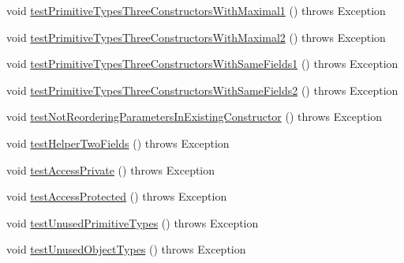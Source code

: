 \begin{DoxyCompactItemize}
\item 
void \hyperlink{classedu_1_1illinois_1_1canistelCassabanana_1_1tests_1_1RemoveDuplicateCodeInConstructorsRefactoringTests_a0e9308bcca1cb335ba5a7f7c263d2ac5}{testPrimitiveTypesThreeConstructorsWithMaximal1} ()  throws Exception 
\item 
void \hyperlink{classedu_1_1illinois_1_1canistelCassabanana_1_1tests_1_1RemoveDuplicateCodeInConstructorsRefactoringTests_a885c02b65cfeeb832428fdce080882e9}{testPrimitiveTypesThreeConstructorsWithMaximal2} ()  throws Exception 
\item 
void \hyperlink{classedu_1_1illinois_1_1canistelCassabanana_1_1tests_1_1RemoveDuplicateCodeInConstructorsRefactoringTests_abec9de907f2c8e893351959365abade5}{testPrimitiveTypesThreeConstructorsWithSameFields1} ()  throws Exception 
\item 
void \hyperlink{classedu_1_1illinois_1_1canistelCassabanana_1_1tests_1_1RemoveDuplicateCodeInConstructorsRefactoringTests_a5025fece6adcfc2d6f4a405bf6e89e89}{testPrimitiveTypesThreeConstructorsWithSameFields2} ()  throws Exception 
\item 
void \hyperlink{classedu_1_1illinois_1_1canistelCassabanana_1_1tests_1_1RemoveDuplicateCodeInConstructorsRefactoringTests_a2f9c0ea69a29c696779870f304728135}{testNotReorderingParametersInExistingConstructor} ()  throws Exception 
\item 
void \hyperlink{classedu_1_1illinois_1_1canistelCassabanana_1_1tests_1_1RemoveDuplicateCodeInConstructorsRefactoringTests_aa470125df472e4cb1d1a93f6768640bc}{testHelperTwoFields} ()  throws Exception 
\item 
void \hyperlink{classedu_1_1illinois_1_1canistelCassabanana_1_1tests_1_1RemoveDuplicateCodeInConstructorsRefactoringTests_abb9c5f98dee1dbd810f5b6bdc26bd39f}{testAccessPrivate} ()  throws Exception 
\item 
void \hyperlink{classedu_1_1illinois_1_1canistelCassabanana_1_1tests_1_1RemoveDuplicateCodeInConstructorsRefactoringTests_a5bf899c6633639b9f92a889e7ed64ab2}{testAccessProtected} ()  throws Exception 
\item 
void \hyperlink{classedu_1_1illinois_1_1canistelCassabanana_1_1tests_1_1RemoveDuplicateCodeInConstructorsRefactoringTests_a927d833f2556deba5e64362b41c11651}{testUnusedPrimitiveTypes} ()  throws Exception 
\item 
void \hyperlink{classedu_1_1illinois_1_1canistelCassabanana_1_1tests_1_1RemoveDuplicateCodeInConstructorsRefactoringTests_aa3dc60ec674bd2b220d9849f34baf483}{testUnusedObjectTypes} ()  throws Exception 
\end{DoxyCompactItemize}

